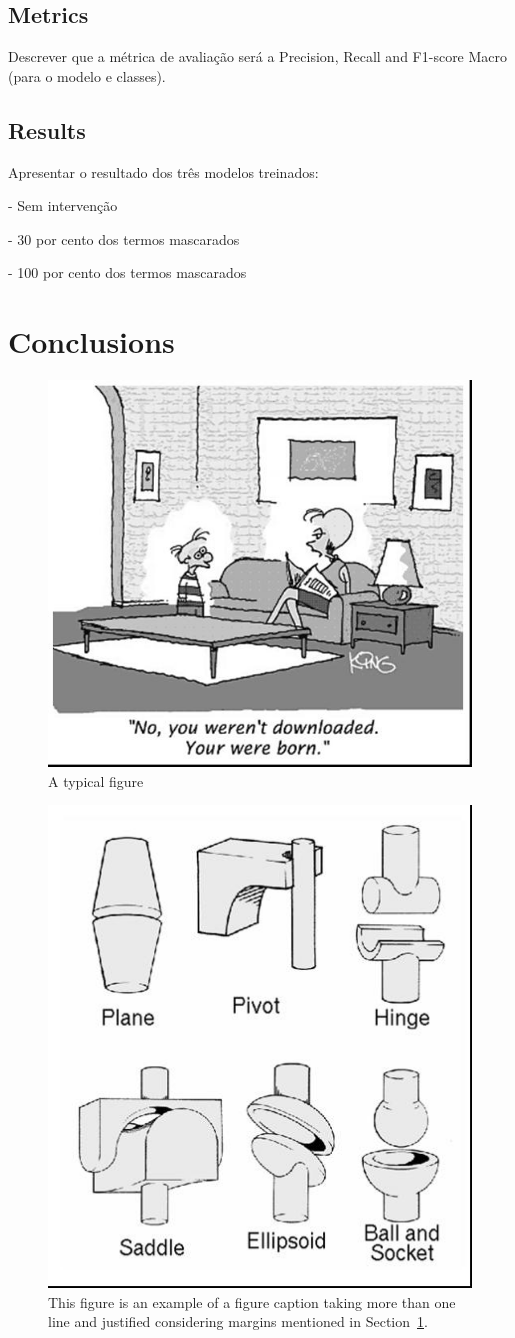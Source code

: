 \documentclass[12pt]{article}
\begin{document}
\subsection{Metrics}
Descrever que a métrica de avaliação será a Precision, Recall and F1-score Macro (para o modelo e classes). 

\subsection{Results}
Apresentar o resultado dos três modelos treinados:

- Sem intervenção

- 30 por cento dos termos mascarados

- 100 por cento dos termos mascarados


\section{Conclusions}\label{sec:figs}


\begin{figure}[ht]
\centering
\includegraphics[width=.5\textwidth]{img/fig1.jpg}
\caption{A typical figure}
\label{fig:exampleFig1}
\end{figure}

\begin{figure}[ht]
\centering
\includegraphics[width=.3\textwidth]{img/fig2.jpg}
\caption{This figure is an example of a figure caption taking more than one
  line and justified considering margins mentioned in Section~\ref{sec:figs}.}
\label{fig:exampleFig2}
\end{figure}
\end{document}
